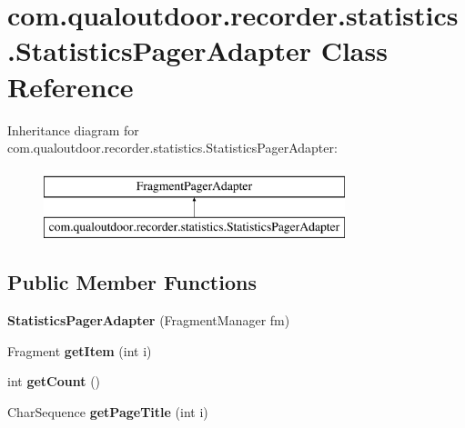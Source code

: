 \hypertarget{classcom_1_1qualoutdoor_1_1recorder_1_1statistics_1_1StatisticsPagerAdapter}{\section{com.\-qualoutdoor.\-recorder.\-statistics.\-Statistics\-Pager\-Adapter Class Reference}
\label{classcom_1_1qualoutdoor_1_1recorder_1_1statistics_1_1StatisticsPagerAdapter}
}
Inheritance diagram for com.\-qualoutdoor.\-recorder.\-statistics.\-Statistics\-Pager\-Adapter\-:\begin{figure}[H]
\begin{center}
\leavevmode
\includegraphics[height=2.000000cm]{classcom_1_1qualoutdoor_1_1recorder_1_1statistics_1_1StatisticsPagerAdapter}
\end{center}
\end{figure}
\subsection*{Public Member Functions}
\begin{DoxyCompactItemize}
\item 
\hypertarget{classcom_1_1qualoutdoor_1_1recorder_1_1statistics_1_1StatisticsPagerAdapter_a5513cfb358b309f7bdde954943f6d8c7}{{\bfseries Statistics\-Pager\-Adapter} (Fragment\-Manager fm)}\label{classcom_1_1qualoutdoor_1_1recorder_1_1statistics_1_1StatisticsPagerAdapter_a5513cfb358b309f7bdde954943f6d8c7}

\item 
\hypertarget{classcom_1_1qualoutdoor_1_1recorder_1_1statistics_1_1StatisticsPagerAdapter_a0ec1243763650f3b047cfde095abb69d}{Fragment {\bfseries get\-Item} (int i)}\label{classcom_1_1qualoutdoor_1_1recorder_1_1statistics_1_1StatisticsPagerAdapter_a0ec1243763650f3b047cfde095abb69d}

\item 
\hypertarget{classcom_1_1qualoutdoor_1_1recorder_1_1statistics_1_1StatisticsPagerAdapter_a9ce894bc0ed657c112da4fec3eb9a982}{int {\bfseries get\-Count} ()}\label{classcom_1_1qualoutdoor_1_1recorder_1_1statistics_1_1StatisticsPagerAdapter_a9ce894bc0ed657c112da4fec3eb9a982}

\item 
\hypertarget{classcom_1_1qualoutdoor_1_1recorder_1_1statistics_1_1StatisticsPagerAdapter_a38adff0033038e48d72f16de75a3bef4}{Char\-Sequence {\bfseries get\-Page\-Title} (int i)}\label{classcom_1_1qualoutdoor_1_1recorder_1_1statistics_1_1StatisticsPagerAdapter_a38adff0033038e48d72f16de75a3bef4}

\end{DoxyCompactItemize}
